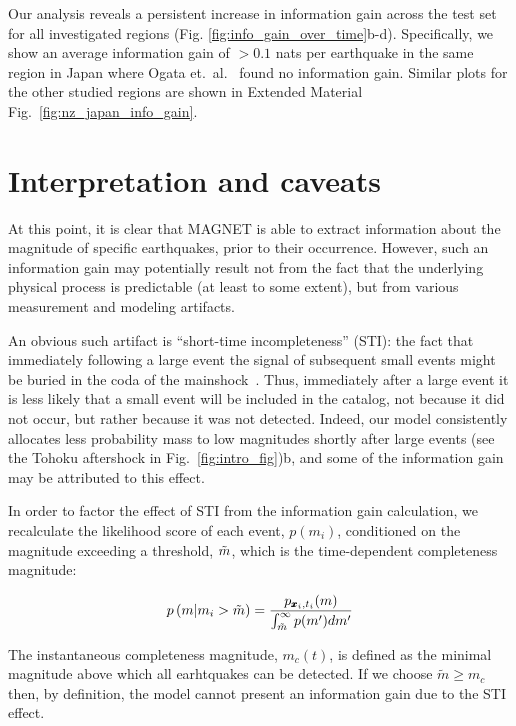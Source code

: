 \documentclass[pdflatex]{sn-jnl}
\begin{document}
Our analysis reveals a persistent increase in information gain across the test set for all investigated regions (Fig. \ref{fig:info_gain_over_time}b-d). Specifically, we show an average information gain of $>0.1$ nats per earthquake in the same region in Japan where Ogata et.~al.~\cite{ogata_exploring_2018} found no information gain. Similar plots for the other studied regions are shown in Extended Material Fig.~\ref{fig:nz_japan_info_gain}.

\section{Interpretation and caveats}
At this point, it is clear that MAGNET is able to extract information about the magnitude of specific earthquakes, prior to their occurrence. However, such an information gain may potentially result not from the fact that the underlying physical process is predictable (at least to some extent), but from various measurement and modeling artifacts. 

An obvious such artifact is ``short-time incompleteness'' (STI): the fact that immediately following a large event the signal of subsequent small events might be buried in the coda of the mainshock~\cite{kagan_short-term_2004, stockman_forecasting_2023}. Thus, immediately after a large event it is less likely that a small event will be included in the catalog, not because it did not occur, but rather because it was not detected. Indeed, our model consistently allocates less probability mass to low magnitudes shortly after large events (see the Tohoku aftershock in Fig.~\ref{fig:intro_fig})b, and some of the information gain may be attributed to this effect.  

In order to factor the effect of STI from the information gain calculation, we recalculate the likelihood score of each event, $p(m_i)$, conditioned on the magnitude exceeding a threshold, $\Tilde{m}$, which is the time-dependent completeness magnitude:

\begin{equation}
    p \left( m \vert m_i > \Tilde{m} \right) = \frac{p_{\pmb{x}_i, t_i}(m)} {\int_{\Tilde{m}}^{\infty} p(m') dm'}
    \label{eq:conditioned_likelihood}
\end{equation}

The instantaneous completeness magnitude, $m_c(t)$, is defined as the minimal magnitude above which all earhtquakes can be detected. If we choose $\tilde m \geq m_c$ then, by definition, the model cannot present an information gain due to the STI effect.
\end{document}
